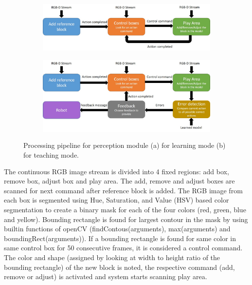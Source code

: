 \begin{figure}[h]
    \begin{subfigure}{1\textwidth}
       \centering
       \includegraphics[width=1\linewidth]{figures/learning_mode.jpg}
      
       \caption[{Learning mode}]{ \label{fig:fig_3-3a}}
    \end{subfigure}
    \begin{subfigure}{1\textwidth}
       \centering
       \includegraphics[width=1\linewidth]{figures/teaching_mode.jpg}
      
       \caption[{Teaching mode}]{ \label{fig:fig_3-3b}}
    \end{subfigure}
    \caption[{Processing pipeline}]{Processing pipeline for perception module (a) for learning mode (b) for teaching mode.}
   \label{fig:fig_3-3}
\end{figure}
The continuous RGB image stream is divided into 4 fixed regions: add box, remove box, adjust box and play area. The add, remove and adjust boxes are scanned for next command after reference block is added. The RGB image from each box is segmented using Hue, Saturation, and Value (HSV) based color segmentation to create a binary mask for each of the four colors (red, green, blue and yellow). Bounding rectangle is found for largest contour in the mask by using builtin functions of openCV (findContous(arguments), max(arguments) and boundingRect(arguments)). If a bounding rectangle is found for same color in same control box for 50 consecutive frames, it is considered a control command. The color and shape (assigned by looking at width to height ratio of the bounding rectangle) of the new block is noted, the respective command (add, remove or adjust) is activated and system starts scanning play area.
